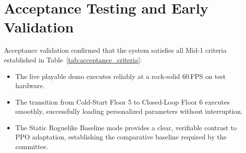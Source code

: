 \section{Acceptance Testing and Early Validation}
Acceptance validation confirmed that the system satisfies all Mid-1 criteria established in Table~\ref{tab:acceptance_criteria}:
\begin{itemize}
    \item The live playable demo executes reliably at a rock-solid 60\,FPS on test hardware.
    \item The transition from Cold-Start Floor 5 to Closed-Loop Floor 6 executes smoothly, successfully loading personalized parameters without interruption.
    \item The Static Roguelike Baseline mode provides a clear, verifiable contrast to PPO adaptation, establishing the comparative baseline required by the committee.
\end{itemize}

